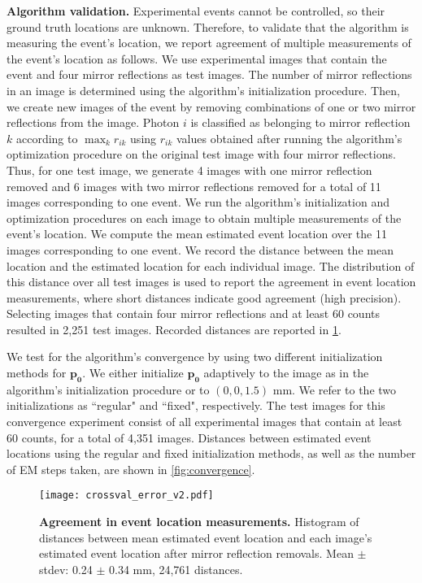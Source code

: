 \noindent
\textbf{Algorithm validation.}
Experimental events cannot be controlled, so their ground truth locations are unknown.
Therefore, to validate that the algorithm is measuring the event's location, we 
report agreement of multiple measurements of the event's location as follows.
We use experimental images that contain the event and four mirror reflections as 
test images.
The number of mirror reflections in an image is determined using the algorithm's 
initialization procedure.
Then, we create new images of the event by removing combinations of one or two 
mirror reflections from the image.
Photon $i$ is classified as belonging to mirror reflection $k$ according to 
$\max_k r_{ik}$ using $r_{ik}$ values obtained after running the algorithm's 
optimization procedure on the original test image with four mirror reflections.
Thus, for one test image, we generate 4 images with one mirror reflection removed 
and 6 images with two mirror reflections removed for a total of 11 images 
corresponding to one event.
We run the algorithm's initialization and optimization procedures on each image to 
obtain multiple measurements of the event's location.
We compute the mean estimated event location over the 11 images corresponding to 
one event.
We record the distance between the mean location and the estimated location for 
each individual image.
The distribution of this distance over all test images is used to report the 
agreement in event location measurements, where short distances indicate good 
agreement (high precision).
Selecting images that contain four mirror reflections and at least 60 counts 
resulted in 2,251 test images.
Recorded distances are reported in \cref{fig:crossval_error}.

We test for the algorithm's convergence by using two different initialization 
methods for $\bm{p_0}$. 
We either initialize $\bm{p_0}$ adaptively to the image as in the algorithm's 
initialization procedure or to $(0,0,1.5)$ mm.
We refer to the two initializations as ``regular" and ``fixed", respectively.
The test images for this convergence experiment consist of all experimental images 
that contain at least 60 counts, for a total of 4,351 images.
Distances between estimated event locations using the regular and fixed 
initialization methods, as well as the number of EM steps taken, are shown in \cref{fig:convergence}.

\begin{figure}
\centering
\texttt{[image: crossval\_error\_v2.pdf]}
\caption{\textbf{Agreement in event location measurements.} Histogram of distances 
between mean estimated event location and each image's estimated event location 
after mirror reflection removals. Mean $\pm$ stdev: 0.24 $\pm$ 0.34 mm, 24,761 distances.
} 
\label{fig:crossval_error}
\end{figure}

